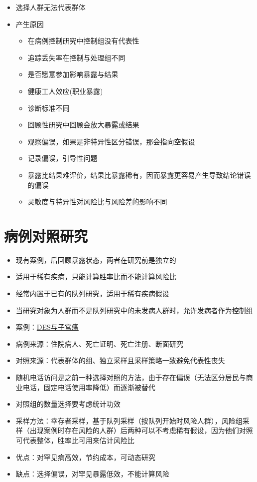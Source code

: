 \documentclass[]{book}
\providecommand{\tightlist}{%
  \setlength{\itemsep}{0pt}\setlength{\parskip}{0pt}}
\begin{document}
\begin{itemize}
\tightlist
\item
  选择人群无法代表群体
\item
  产生原因

  \begin{itemize}
  \tightlist
  \item
    在病例控制研究中控制组没有代表性
  \item
    追踪丢失率在控制与处理组不同
  \item
    是否愿意参加影响暴露与结果
  \item
    健康工人效应(职业暴露)
  \item
    诊断标准不同
  \item
    回顾性研究中回顾会放大暴露或结果
  \item
    观察偏误，如果是非特异性区分错误，那会指向空假设
  \item
    记录偏误，引导性问题
  \item
    暴露比结果难评价，结果比暴露稀有，因而暴露更容易产生导致结论错误的偏误
  \item
    灵敏度与特异性对风险比与风险差的影响不同
  \end{itemize}
\end{itemize}

\hypertarget{ux75c5ux4f8bux5bf9ux7167ux7814ux7a76}{%
\section{病例对照研究}\label{ux75c5ux4f8bux5bf9ux7167ux7814ux7a76}}

\begin{itemize}
\tightlist
\item
  现有案例，后回顾暴露状态，两者在研究前是独立的
\item
  适用于稀有疾病，只能计算胜率比而不能计算风险比
\item
  经常内置于已有的队列研究，适用于稀有疾病假设
\item
  当研究对象为人群而不是队列研究中的未发病人群时，允许发病者作为控制组
\item
  案例：\href{http://www.cancer.gov/about-cancer/causes-prevention/risk/hormones/des-fact-sheet}{DES与子宫癌}
\item
  病例来源：住院病人、死亡证明、死亡注册、断面研究
\item
  对照来源：代表群体的组、独立采样且采样策略一致避免代表性丧失
\item
  随机电话访问是之前一种选择对照的方法，由于存在偏误（无法区分居民与商业电话，固定电话使用率降低）而逐渐被替代
\item
  对照组的数量选择要考虑统计功效
\item
  采样方法：幸存者采样，基于队列采样（按队列开始时风险人群），风险组采样（出现案例时存在风险的人群）后两种可以不考虑稀有假设，因为他们对照可代表整体，胜率比可用来估计风险比
\item
  优点：对罕见病高效，节约成本，可动态研究
\item
  缺点：选择偏误，对罕见暴露低效，不能计算风险
\end{itemize}
\end{document}
